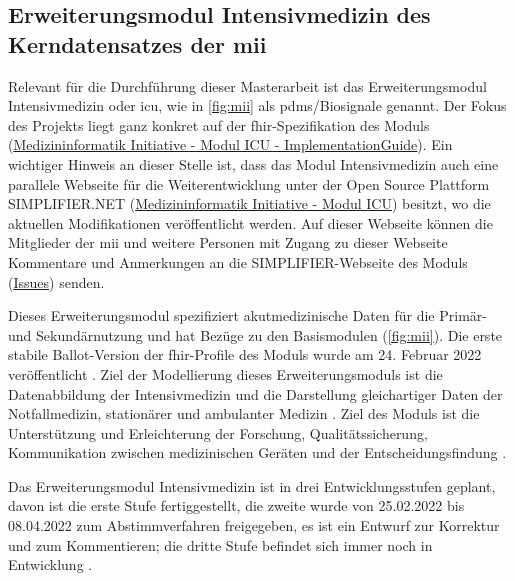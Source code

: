 \subsection{Erweiterungsmodul \glqq Intensivmedizin\grqq{} des Kerndatensatzes der \acs{mii}} \label{subsec:icumodul}

Relevant für die Durchführung dieser Masterarbeit ist das Erweiterungsmodul \glqq Intensivmedizin\grqq{} oder \ac{icu}, wie in \ref{fig:mii} als \acs{pdms}/Biosignale genannt. Der Fokus des Projekts liegt ganz konkret auf der \ac{fhir}-Spezifikation des Moduls (\href{https://www.medizininformatik-initiative.de/Kerndatensatz/Modul_Intensivmedizin/IGMIIKDSModulICU.html}{Medizininformatik Initiative - Modul ICU - ImplementationGuide}). Ein wichtiger Hinweis an dieser Stelle ist, dass das Modul \glqq Intensivmedizin\grqq{} auch eine parallele Webseite für die Weiterentwicklung unter der Open Source Plattform SIMPLIFIER.NET (\href{https://simplifier.net/medizininformatikinitiative-modul-intensivmedizin}{Medizininformatik Initiative - Modul ICU}) besitzt, wo die aktuellen Modifikationen veröffentlicht werden. Auf dieser Webseite können die Mitglieder der \ac{mii} und weitere Personen mit Zugang zu dieser Webseite Kommentare und Anmerkungen an die SIMPLIFIER-Webseite des Moduls (\href{https://simplifier.net/MedizininformatikInitiative-Modul-Intensivmedizin/~issues}{Issues}) senden.

Dieses Erweiterungsmodul spezifiziert akutmedizinische Daten für die Primär- und Sekundärnutzung und hat Bezüge zu den Basismodulen (\ref{fig:mii}). Die erste stabile Ballot-Version der \ac{fhir}-Profile des Moduls wurde am 24. Februar 2022 veröffentlicht \cite{modicu}. Ziel der Modellierung dieses Erweiterungsmoduls ist die Datenabbildung der Intensivmedizin und die Darstellung gleichartiger Daten der Notfallmedizin, stationärer und ambulanter Medizin \cite{icukdz}. Ziel des Moduls ist die Unterstützung und Erleichterung der Forschung, Qualitätssicherung, Kommunikation zwischen medizinischen Geräten und der Entscheidungsfindung \cite{modicuvid}.

Das Erweiterungsmodul \glqq Intensivmedizin\grqq{} ist in drei Entwicklungsstufen geplant, davon ist die erste Stufe fertiggestellt, die zweite wurde von 25.02.2022 bis 08.04.2022 zum Abstimmverfahren freigegeben, es ist ein Entwurf zur Korrektur und zum Kommentieren; die dritte Stufe befindet sich immer noch in Entwicklung \cite{modicuvid}.

